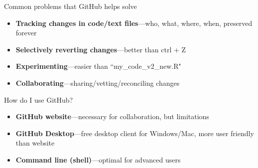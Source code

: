\documentclass[12pt, compress]{beamer} %
\renewcommand{\texttt}[2][ceruleanblue]{\textcolor{#1}{\ttfamily #2}}%
\let\noteitem\item %
\renewcommand{\item}{ 
	\noteitem\vspace{\fill}
	}
\begin{document}
	\begin{frame}{Common problems that GitHub helps solve}
		\begin{itemize}
			\item \textbf{Tracking changes in code/text files}---who, what, where, when, preserved forever
			\item \textbf{Selectively reverting changes}---better than \texttt{ctrl + Z}
			\item \textbf{Experimenting}---easier than ``my\_code\_v2\_new.R"
			\item \textbf{Collaborating}---sharing/vetting/reconciling changes
		\end{itemize}
	\end{frame}
	
%	
%	
		
	\begin{frame}{How do I use GitHub?}
		\begin{itemize}
			\item \textbf{GitHub website}---necessary for collaboration, but limitations
			\item \textbf{GitHub Desktop}---free desktop client for Windows/Mac, more user friendly than website
			\item \textbf{Command line (shell)}---optimal for advanced users
		\end{itemize}
	\end{frame}
\end{document}
